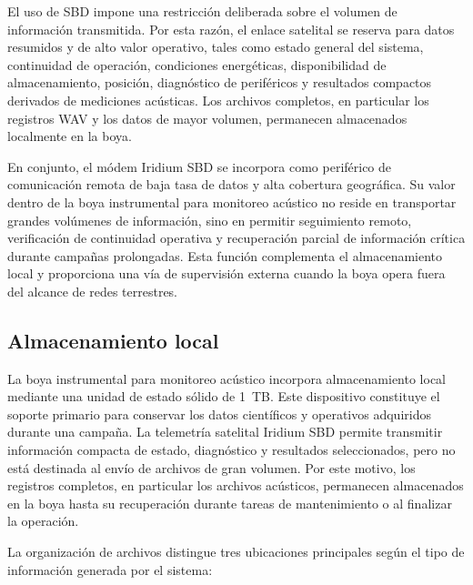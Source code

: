 El uso de SBD impone una restricción deliberada sobre el volumen de información transmitida. Por esta razón, el enlace satelital se reserva para datos resumidos y de alto valor operativo, tales como estado general del sistema, continuidad de operación, condiciones energéticas, disponibilidad de almacenamiento, posición, diagnóstico de periféricos y resultados compactos derivados de mediciones acústicas. Los archivos completos, en particular los registros WAV y los datos de mayor volumen, permanecen almacenados localmente en la boya.

En conjunto, el módem Iridium SBD se incorpora como periférico de comunicación remota de baja tasa de datos y alta cobertura geográfica. Su valor dentro de la boya instrumental para monitoreo acústico no reside en transportar grandes volúmenes de información, sino en permitir seguimiento remoto, verificación de continuidad operativa y recuperación parcial de información crítica durante campañas prolongadas. Esta función complementa el almacenamiento local y proporciona una vía de supervisión externa cuando la boya opera fuera del alcance de redes terrestres.

\subsection{Almacenamiento local}
\label{subsec:almacenamiento_local}

La boya instrumental para monitoreo acústico incorpora almacenamiento local mediante una unidad de estado sólido de 1~TB. Este dispositivo constituye el soporte primario para conservar los datos científicos y operativos adquiridos durante una campaña. La telemetría satelital Iridium SBD permite transmitir información compacta de estado, diagnóstico y resultados seleccionados, pero no está destinada al envío de archivos de gran volumen. Por este motivo, los registros completos, en particular los archivos acústicos, permanecen almacenados en la boya hasta su recuperación durante tareas de mantenimiento o al finalizar la operación.

La organización de archivos distingue tres ubicaciones principales según el tipo de información generada por el sistema:


